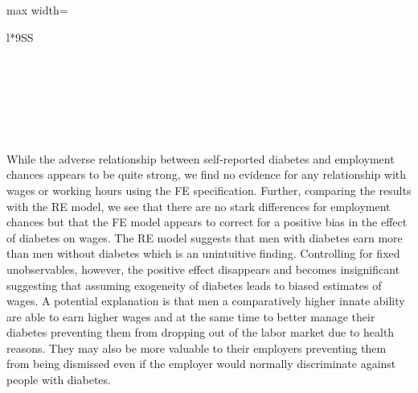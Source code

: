 \documentclass[12pt,english,british]{article}
\newcommand{\sym}[1]{\rlap{#1}}%
\begin{document}
\begin{table}[h]
\begin{center}
\begin{adjustbox}{max width=\textwidth}
{\begin{tabular}{l*{9}{SS}}
\bottomrule
{}\\
\\
\\
\\
\\
\\
\multicolumn{10}{l}{\footnotesize \sym{*} \(p<0.10\), \sym{**} \(p<0.05\), \sym{***} \(p<0.01\).}\\
\end{tabular}%
}
\end{adjustbox}
\end{center}
\end{table}

While the adverse relationship between self-reported diabetes and
employment chances appears to be quite strong, we find no evidence
for any relationship with wages or working hours using the \ac{FE} specification. Further, comparing the results with the \ac{RE} model, we see that there are no stark differences for employment chances but that the \ac{FE} model appears to correct for a positive bias in the effect of diabetes on wages. The \ac{RE} model suggests that men with diabetes earn more than men without diabetes which is an unintuitive finding. Controlling for fixed unobservables, however, the positive effect disappears and becomes insignificant suggesting that assuming exogeneity of diabetes leads to biased estimates of wages. A potential explanation is that men a comparatively higher innate ability are able to earn higher wages and at the same time to better manage their diabetes preventing them from dropping out of the labor market due to health reasons. They may also be more valuable to their employers preventing them from being dismissed even if the employer would normally discriminate against people with diabetes.
\end{document}
